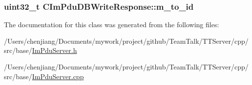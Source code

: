 \subsubsection[{m\+\_\+to\+\_\+id}]{\setlength{\rightskip}{0pt plus 5cm}uint32\+\_\+t C\+Im\+Pdu\+D\+B\+Write\+Response\+::m\+\_\+to\+\_\+id\hspace{0.3cm}{\ttfamily [private]}}\label{class_c_im_pdu_d_b_write_response_a68a090de6a09453f6ee3dd84dabedb3e}


The documentation for this class was generated from the following files\+:\begin{DoxyCompactItemize}
\item 
/\+Users/chenjiang/\+Documents/mywork/project/github/\+Team\+Talk/\+T\+T\+Server/cpp/src/base/\hyperlink{_im_pdu_server_8h}{Im\+Pdu\+Server.\+h}\item 
/\+Users/chenjiang/\+Documents/mywork/project/github/\+Team\+Talk/\+T\+T\+Server/cpp/src/base/\hyperlink{_im_pdu_server_8cpp}{Im\+Pdu\+Server.\+cpp}\end{DoxyCompactItemize}
